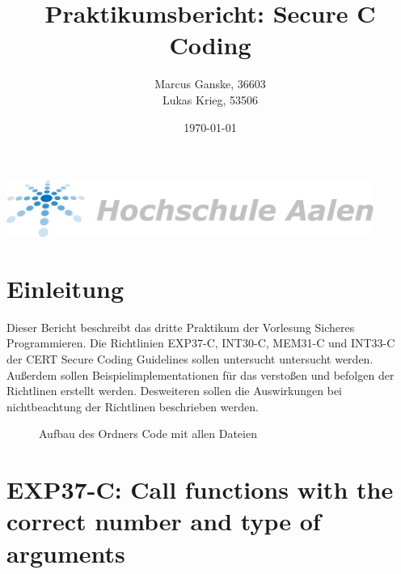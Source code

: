\documentclass[12pt]{article}
\title{Praktikumsbericht: Secure C Coding}
\author{Marcus Ganske, 36603\\
		Lukas Krieg, 53506}
\date{\today}
\begin{document}
\maketitle
\vspace{+8cm}{
}
\includegraphics[width=12cm]{Hochschule-aalen.pdf}

\newpage
\renewcommand\contentsname{Inhaltsverzeichnis}
\tableofcontents
\newpage

	
	\section{Einleitung}
    Dieser Bericht beschreibt das dritte Praktikum der Vorlesung Sicheres Programmieren. Die Richtlinien EXP37-C, INT30-C, MEM31-C und INT33-C der CERT Secure Coding Guidelines sollen untersucht untersucht werden. Außerdem sollen Beispielimplementationen für das verstoßen und befolgen der Richtlinen erstellt werden. Desweiteren sollen die Auswirkungen bei nichtbeachtung der Richtlinen beschrieben werden.
	\begin{figure}[H]
	
		\caption{Aufbau des Ordners Code mit allen Dateien}
	\end{figure}	

\newpage
\section{EXP37-C: Call functions with the correct number and type of arguments}
\end{document}
